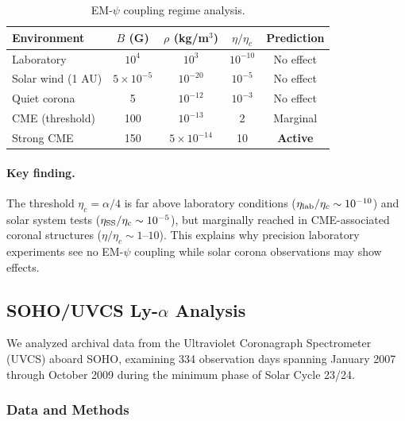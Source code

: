 \begin{table}[h]
\caption{EM-$\psi$ coupling regime analysis.}
\label{tab:regimes-corona}
\begin{ruledtabular}
\begin{tabular}{lcccc}
Environment & $B$ (G) & $\rho$ (kg/m$^3$) & $\eta/\eta_c$ & Prediction \\
\hline
Laboratory & $10^4$ & $10^3$ & $10^{-10}$ & No effect \\
Solar wind (1 AU) & $5\times10^{-5}$ & $10^{-20}$ & $10^{-5}$ & No effect \\
Quiet corona & 5 & $10^{-12}$ & $10^{-3}$ & No effect \\
CME (threshold) & 100 & $10^{-13}$ & 2 & Marginal \\
Strong CME & 150 & $5\times10^{-14}$ & 10 & \textbf{Active} \\
\end{tabular}
\end{ruledtabular}
\end{table}

\paragraph{Key finding.}
The threshold $\eta_c = \alpha/4$ is far above laboratory conditions 
($\eta_{\rm lab}/\eta_c \sim 10^{-10}$) and solar system tests 
($\eta_{\rm SS}/\eta_c \sim 10^{-5}$), but marginally reached in CME-associated 
coronal structures ($\eta/\eta_c \sim 1$--$10$). This explains why precision 
laboratory experiments see no EM-$\psi$ coupling while solar corona observations 
may show effects.

\subsection{SOHO/UVCS Ly-$\alpha$ Analysis}\label{sec:uvcs-lya}

We analyzed archival data from the Ultraviolet Coronagraph Spectrometer (UVCS) 
aboard SOHO, examining 334 observation days spanning January 2007 through October 
2009 during the minimum phase of Solar Cycle 23/24.

\subsubsection{Data and Methods}

